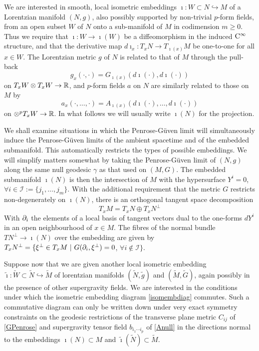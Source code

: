 We are interested in smooth, local isometric embeddings $\imath:W\subset
N\hookrightarrow M$ of a Lorentzian manifold $(N,g)$, also possibly supported by
non-trivial $p$-form fields, from an open subset $W$ of $N$ onto a sub-manifold
of $M$ in codimension $m\geq0$. Thus we require that $\imath:W\to\imath(W)$ be a
diffeomorphism in the induced ${\rm C}^\infty$ structure, and that the
derivative map $d\imath_x:T_xN\to T_{\imath(x)}M$ be one-to-one for all $x\in
W$. The Lorentzian metric $g$ of $N$ is related to that of $M$ through the
pull-back
\begin{equation}
  \label{gNpullback}
  g_x(\cdot, \cdot)=G_{\imath(x)}(d\imath(\cdot), d\imath(\cdot))
\end{equation}
on $T_xW\otimes T_xW\to{\mathbb R}$, and $p$-form fields $a$ on $N$ are similarly
related to those on $M$ by
\begin{equation}
  \label{aNpullback}
  a_x(\cdot,\ldots,\cdot)=A_{\imath(x)} (d\imath(\cdot),\ldots,d\imath(\cdot))
\end{equation}
on $\otimes^pT_xW\to{\mathbb R}$. In what follows we will usually write $\imath(N)$
for the projection.

We shall examine situations in which the Penrose-G\"uven limit will
simultaneously induce the Penrose-G\"uven limits of the ambient spacetime and of
the embedded submanifold. This automatically restricts the types of possible
embeddings. We will simplify matters somewhat by taking the Penrose-G\"uven
limit of $(N,g)$ along the same null geodesic $\gamma$ as that used on $(M,G)$.
The embedded submanifold $\imath(N)$ is then the intersection of $M$ with the
hypersurface $Y^i=0$, $\forall i\in{\mathcal I}:=\{j_1,\dots,j_m\}$. With the
additional requirement that the metric $G$ restricts non-degenerately on
$\imath(N)$, there is an orthogonal tangent space decomposition
\begin{equation}
  \label{taudecomp}
  T_xM=T_xN\oplus T_xN^\perp
\end{equation}
With $\partial_i$ the elements of a local basis of tangent vectors dual to the
one-forms $d Y^i$ in an open neighbourhood of $x\in M$. The fibres of the normal
bundle $TN^\perp\to\imath(N)$ over the embedding are given by
$T_xN^\perp=\{\xi^\perp\in T_xM~|~G(\partial_i,\xi^\perp)=0$, $\forall
i\notin{\mathcal I}\}$.

Suppose now that we are given another local isometric embedding
$\widetilde{\imath}:\widetilde{W}\subset\widetilde{N}\hookrightarrow
\widetilde{M}$ of lorentzian manifolds $(\widetilde{N},\widetilde{g})$ and
$(\widetilde{M},\widetilde{G})$, again possibly in the presence of other
supergravity fields. We are interested in the conditions under which the
isometric embedding diagram \eqref{isomembdiag} commutes. Such a commutative
diagram can only be written down under very exact symmetry constraints on the
geodesic restrictions of the transverse plane metric $C_{ij}$ of
\eqref{GPenrose} and supergravity tensor field $b_{i_1\cdots i_p}$ of
\eqref{Anull} in the directions normal to the embeddings $\imath(N)\subset M$
and $\widetilde{\imath}(\widetilde{N})\subset\widetilde{M}$.

